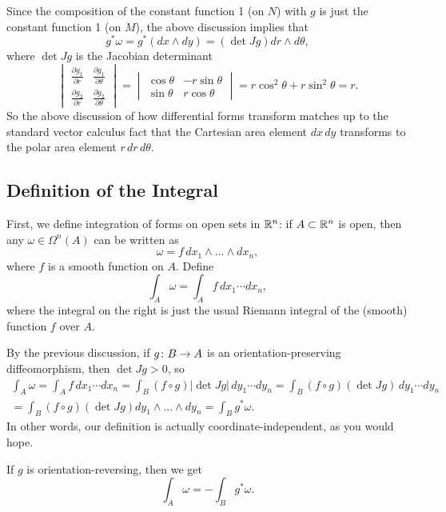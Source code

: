 \begin{example}
	Since the composition of the constant function 1 (on $N$) with $g$ is just the constant function 1 (on $M$), the above discussion implies that
	\[
		g^\ast \omega = g^\ast(dx \wedge dy) = (\det Jg) dr \wedge d\theta,
	\]
	where $\det Jg$ is the Jacobian determinant
	\[
		\begin{vmatrix} \frac{\partial g_1}{\partial r} & \frac{\partial g_1}{\partial \theta} \\ \frac{\partial g_2}{\partial r} & \frac{\partial g_2}{\partial \theta} \end{vmatrix} = \begin{vmatrix}\cos\theta & -r \sin \theta  \\ \sin \theta  & r \cos \theta\end{vmatrix} = r \cos^2\theta+r\sin^2\theta  = r.
	\]
	So the above discussion of how differential forms transform matches up to the standard vector calculus fact that the Cartesian area element $dx\, dy$ transforms to the polar area element $r\, dr \, d\theta$.
\end{example}

\subsection{Definition of the Integral}
\label{sub:definition_of_the_integral}

First, we define integration of forms on open sets in $\mathbb{R}^n$: if $A \subset \mathbb{R}^n$ is open, then any $\omega \in \Omega^n(A)$ can be written as
\[
	\omega = f\, dx_1 \wedge \dots \wedge dx_n,
\]
where $f$ is a smooth function on $A$. Define
\[
	\int_A \omega = \int_A f \, dx_1 \cdots dx_n,
\]
where the integral on the right is just the usual Riemann integral of the (smooth) function $f$ over $A$.

By the previous discussion, if $g \colon\thinspace\! B \to A$ is an orientation-preserving diffeomorphism, then $\det Jg > 0$, so
\begin{multline*}
	\int_A \omega = \int_A f \, dx_1 \cdots dx_n = \int_B(f \circ g) |\det Jg| \, dy_1 \cdots dy_n = \int_B (f \circ g) (\det Jg) \, dy_1 \cdots dy_n \\
	 = \int_B(f \circ g) (\det Jg) dy_1 \wedge \dots \wedge dy_n = \int_B g^\ast \omega.
\end{multline*}
In other words, our definition is actually coordinate-independent, as you would hope.

If $g$ is orientation-reversing, then we get
\[
	\int_A \omega = -\int_B g^\ast \omega.
\]

